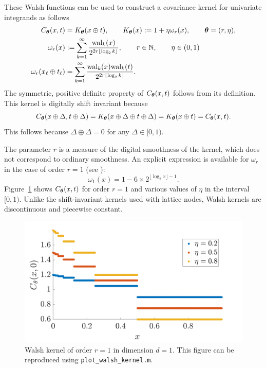 \documentclass[graybox,footinfo]{svmult}
\begin{document}
These Walsh functions can be used to construct a covariance kernel for univariate integrands as follows
\begin{align}
    \nonumber
    C_{\boldsymbol{\theta}} (x,t) & = K_{\boldsymbol{\theta}}(x \oplus t), \qquad K_{\boldsymbol{\theta}}(x) : = 1 + \eta \omega_{r} (x), \qquad {\boldsymbol{\theta}} = (r,\eta), \\
    \nonumber
    \omega_r(x) & := \sum_{k=1}^\infty \frac{\textup{wal}_{k}(x) }{2^{2r \lfloor \log_2 k \rfloor}}, \qquad r \in {{\mathbb{N}}}, \qquad \eta \in (0, 1)\\
    \nonumber
    \omega_{r} (x_\ell \oplus t_\ell) & = \sum_{k=1}^\infty \frac{\textup{wal}_{k}(x) \textup{wal}_{k}(t)  }{2^{2r \lfloor \log_2 k \rfloor}}.
\end{align}
The symmetric, positive definite property of $ C_{\boldsymbol{\theta}} (x,t)$ follows from its definition.  This kernel is digitally shift invariant because 
\[
C_{\boldsymbol{\theta}} (x \oplus \Delta ,t \oplus \Delta ) = K_{\boldsymbol{\theta}}(x \oplus \Delta \oplus t \oplus \Delta) = K_{\boldsymbol{\theta}}(x \oplus t) =  C_{\boldsymbol{\theta}} (x,t).
\]
This follows because $\Delta \oplus \Delta = 0$ for any $\Delta \in [0,1)$.

The parameter $r$ is a measure of the digital smoothness of the kernel, which does not correspond to ordinary smoothness.  An explicit expression is available for $\omega_{r}$ in the case of order $r=1$ (see \cite{Nuyens2013}):
\begin{equation}
\nonumber
\omega_1(x) 
= 1  - 6 \times 2^{\lfloor \log_2 x \rfloor -1 }.
\end{equation}
Figure~\ref{FJ:fig:walshkernel-dim1} shows $C_{\boldsymbol{\theta}} (x,t)$ for order $r=1$ and various values of $\eta$ in the interval $[0,1)$. Unlike the shift-invariant kernels used with lattice nodes, Walsh kernels are discontinuous and piecewise constant. 

\begin{figure}
	\centering
	\includegraphics[width=0.9\linewidth]{"figures/walsh_kernel dim_1"}
	\caption[Walsh kernel]{Walsh kernel of order $r=1$ in dimension $d=1$. This figure can be reproduced using \texttt{plot\_walsh\_kernel.m}. 
	}
	\label{FJ:fig:walshkernel-dim1}
\end{figure}
\end{document}

